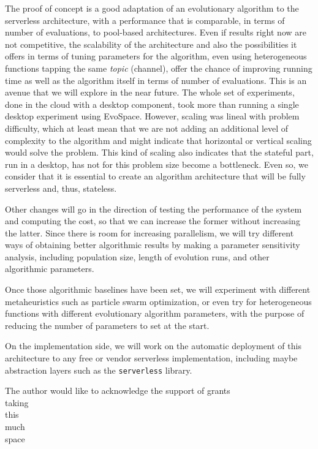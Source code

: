 \documentclass[sigconf]{acmart}
\begin{document}
The proof of concept is a good adaptation of an evolutionary algorithm
to the serverless architecture, with a performance that is comparable,
in terms of number of evaluations, to pool-based architectures. Even
if results right now are not competitive, the scalability of the
architecture and also the possibilities it offers in terms of tuning
parameters for the algorithm, even using heterogeneous functions
tapping the same {\em topic} (channel), offer the chance of improving
running time as well as the algorithm itself in terms of number of
evaluations. This is an avenue that we will explore in the near
future. The whole set of experiments, done in the cloud with a desktop
component, took more than running a single desktop experiment using
EvoSpace. However, scaling was lineal with problem difficulty, which
at least mean that we are not adding an additional level of complexity
to the algorithm and might indicate that horizontal or vertical
scaling would solve the problem. This kind of scaling also indicates
that the stateful part, run in a desktop, has not for this problem
size become a bottleneck. Even so, we consider that it is essential to
create an algorithm architecture that will be fully serverless and,
thus, stateless. 

Other changes will go in the direction of testing the performance of
the system and computing the cost, so that we can increase the former
without increasing the latter. Since there is room for increasing
parallelism, we will try different ways of obtaining better
algorithmic results by making a parameter sensitivity analysis,
including population size, length of evolution runs, and other
algorithmic parameters.

Once those algorithmic baselines have been set, we will experiment
with different metaheuristics such as particle swarm optimization, or
even try for heterogeneous functions with different evolutionary
algorithm parameters, with the purpose of reducing the number of
parameters to set at the start.

On the implementation side, we will work on the automatic deployment
of this architecture to any free or vendor serverless implementation,
including maybe abstraction layers such as the {\tt serverless}
library. 




\begin{acks}

  The author would like to acknowledge the support of grants\\
  taking\\
  this\\
  much\\
  space\\

\end{acks}




\end{document}
